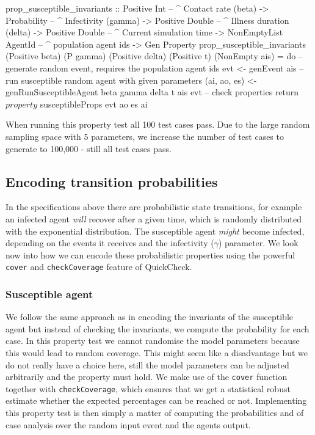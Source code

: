 \begin{HaskellCode}
prop_susceptible_invariants :: Positive Int         -- ^ Contact rate (beta)
                            -> Probability          -- ^ Infectivity (gamma)
                            -> Positive Double      -- ^ Illness duration (delta)
                            -> Positive Double      -- ^ Current simulation time
                            -> NonEmptyList AgentId -- ^ population agent ids
                            -> Gen Property
prop_susceptible_invariants 
  (Positive beta) (P gamma) (Positive delta) (Positive t) (NonEmpty ais) = do
  -- generate random event, requires the population agent ids
  evt <- genEvent ais
  -- run susceptible random agent with given parameters
  (ai, ao, es) <- genRunSusceptibleAgent beta gamma delta t ais evt
  -- check properties
  return $ property $ susceptibleProps evt ao es ai
\end{HaskellCode}

When running this property test all 100 test cases pass. Due to the large random sampling space with 5 parameters, we increase the number of test cases to generate to 100,000 - still all test cases pass.

\subsection{Encoding transition probabilities}
In the specifications above there are probabilistic state transitions, for example an infected agent \textit{will} recover after a given time, which is randomly distributed with the exponential distribution. The susceptible agent \textit{might} become infected, depending on the events it receives and the infectivity ($\gamma$) parameter. We look now into how we can encode these probabilistic properties using the powerful \texttt{cover} and \texttt{checkCoverage} feature of QuickCheck.

\subsubsection{Susceptible agent}
We follow the same approach as in encoding the invariants of the susceptible agent but instead of checking the invariants, we compute the probability for each case. In this property test we cannot randomise the model parameters because this would lead to random coverage. This might seem like a disadvantage but we do not really have a choice here, still the model parameters can be adjusted arbitrarily and the property must hold. %
We make use of the \texttt{cover} function together with \texttt{checkCoverage}, which ensures that we get a statistical robust estimate whether the expected percentages can be reached or not. Implementing this property test is then simply a matter of computing the probabilities and of case analysis over the random input event and the agents output.

